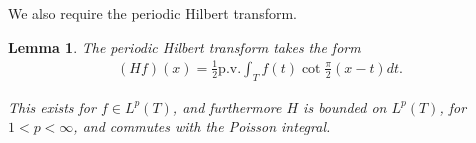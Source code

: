 \documentclass[a4paper, oneside, 12pt]{amsart}
\newtheorem{lemma}{Lemma}
\newcommand{\R}{\mathbb{R}}
\begin{document}

We also require the periodic Hilbert transform.
 
\begin{lemma}\label{lemma:2}
    The periodic Hilbert transform takes the form
    \begin{align*}
        (Hf)(x) = \frac{1}{2} \mathrm{p.v.}\int_T f(t) \cot \frac{\pi}{2} (x-t)dt.
    \end{align*}
    
    This exists for $f\in L^p(T)$, and furthermore $H$ is bounded on $L^p(T)$, for $1<p<\infty$, and commutes with the Poisson integral. 
\end{lemma}
\end{document}
